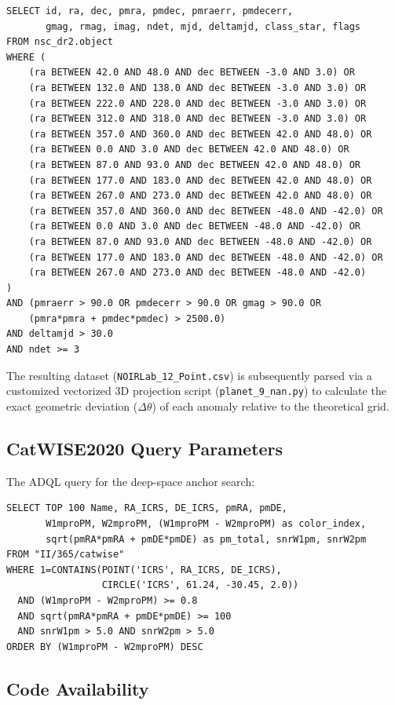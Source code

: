 \documentclass[11pt,a4paper]{article}
\theoremstyle{remark}
\begin{document}
\begin{verbatim}
SELECT id, ra, dec, pmra, pmdec, pmraerr, pmdecerr, 
       gmag, rmag, imag, ndet, mjd, deltamjd, class_star, flags
FROM nsc_dr2.object
WHERE (
    (ra BETWEEN 42.0 AND 48.0 AND dec BETWEEN -3.0 AND 3.0) OR
    (ra BETWEEN 132.0 AND 138.0 AND dec BETWEEN -3.0 AND 3.0) OR
    (ra BETWEEN 222.0 AND 228.0 AND dec BETWEEN -3.0 AND 3.0) OR
    (ra BETWEEN 312.0 AND 318.0 AND dec BETWEEN -3.0 AND 3.0) OR
    (ra BETWEEN 357.0 AND 360.0 AND dec BETWEEN 42.0 AND 48.0) OR
    (ra BETWEEN 0.0 AND 3.0 AND dec BETWEEN 42.0 AND 48.0) OR
    (ra BETWEEN 87.0 AND 93.0 AND dec BETWEEN 42.0 AND 48.0) OR
    (ra BETWEEN 177.0 AND 183.0 AND dec BETWEEN 42.0 AND 48.0) OR
    (ra BETWEEN 267.0 AND 273.0 AND dec BETWEEN 42.0 AND 48.0) OR
    (ra BETWEEN 357.0 AND 360.0 AND dec BETWEEN -48.0 AND -42.0) OR
    (ra BETWEEN 0.0 AND 3.0 AND dec BETWEEN -48.0 AND -42.0) OR
    (ra BETWEEN 87.0 AND 93.0 AND dec BETWEEN -48.0 AND -42.0) OR
    (ra BETWEEN 177.0 AND 183.0 AND dec BETWEEN -48.0 AND -42.0) OR
    (ra BETWEEN 267.0 AND 273.0 AND dec BETWEEN -48.0 AND -42.0)
)
AND (pmraerr > 90.0 OR pmdecerr > 90.0 OR gmag > 90.0 OR 
    (pmra*pmra + pmdec*pmdec) > 2500.0)
AND deltamjd > 30.0
AND ndet >= 3
\end{verbatim}

The resulting dataset (\texttt{NOIRLab\_12\_Point.csv}) is subsequently parsed via a customized vectorized 3D projection script (\texttt{planet\_9\_nan.py}) to calculate the exact geometric deviation ($\Delta\theta$) of each anomaly relative to the theoretical grid.

\subsection{CatWISE2020 Query Parameters}

The ADQL query for the deep-space anchor search:
\begin{verbatim}
SELECT TOP 100 Name, RA_ICRS, DE_ICRS, pmRA, pmDE,
       W1mproPM, W2mproPM, (W1mproPM - W2mproPM) as color_index,
       sqrt(pmRA*pmRA + pmDE*pmDE) as pm_total, snrW1pm, snrW2pm
FROM "II/365/catwise"
WHERE 1=CONTAINS(POINT('ICRS', RA_ICRS, DE_ICRS), 
                 CIRCLE('ICRS', 61.24, -30.45, 2.0))
  AND (W1mproPM - W2mproPM) >= 0.8
  AND sqrt(pmRA*pmRA + pmDE*pmDE) >= 100
  AND snrW1pm > 5.0 AND snrW2pm > 5.0
ORDER BY (W1mproPM - W2mproPM) DESC
\end{verbatim}

\subsection{Code Availability}
\end{document}
